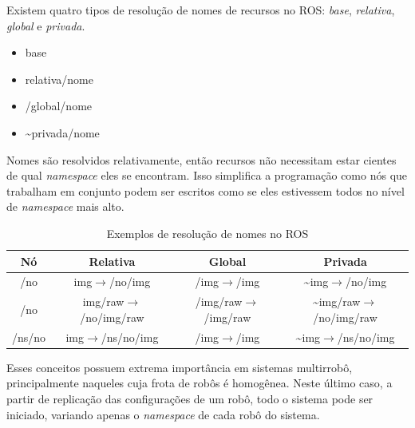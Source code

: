                 Existem quatro tipos de resolução de nomes de recursos no ROS: \textit{base}, \textit{relativa}, \textit{global} e \textit{privada}.
                
                \begin{itemize}
                    \item base
                    
                    \item relativa/nome
                    
                    \item /global/nome
                    
                    \item \textasciitilde privada/nome
                \end{itemize}
                
                Nomes são resolvidos relativamente, então recursos não necessitam estar cientes de qual \textit{namespace} eles se encontram. Isso simplifica a programação como nós que trabalham em conjunto podem ser escritos como se eles estivessem todos no nível de \textit{namespace} mais alto.
                
                \begin{table}[hbt]
                    \setlength\extrarowheight{4pt}
                    \centering
                    \caption{Exemplos de resolução de nomes no ROS}
                    \label{tab:ros_nomes}
                    \begin{tabular}{c c c c}
                        \toprule
                        \textbf{Nó} & \textbf{Relativa} &  \textbf{Global} & \textbf{Privada} \\
                        \midrule
                        /no & img$\to$/no/img & /img$\to$/img & \textasciitilde img$\to$/no/img \\
                        /no & img/raw$\to$/no/img/raw & /img/raw$\to$/img/raw & \textasciitilde img/raw$\to$/no/img/raw \\
                        /ns/no & img$\to$/ns/no/img & /img$\to$/img & \textasciitilde img$\to$/ns/no/img \\
                        \bottomrule
                    \end{tabular}
                \end{table}
                
                Esses conceitos possuem extrema importância em sistemas multirrobô, principalmente naqueles cuja frota de robôs é homogênea. Neste último caso, a partir de replicação das configurações de um robô, todo o sistema pode ser iniciado, variando apenas o \textit{namespace} de cada robô do sistema.
            
